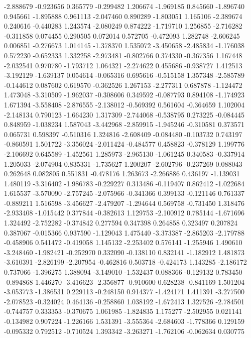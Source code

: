 -2.888679
-0.923656
0.365779
-0.299482
1.206674
-1.969185
0.845660
-1.896740
0.945661
-1.895888
0.961113
-2.047460
0.890289
-1.803051
1.165106
-2.389674
0.240616
-0.440283
1.243574
-2.080249
0.874222
-1.719710
1.256855
-2.716282
-0.311858
0.074455
0.290505
0.072014
0.572705
-0.472093
1.282748
-2.606245
0.006851
-0.276673
1.014145
-1.378370
1.535072
-3.450658
-2.485834
-1.176038
0.572230
-0.652333
1.332258
-2.973481
-0.802766
0.374330
-0.367356
1.167448
-2.032541
0.970780
-1.793712
1.064321
-2.274622
0.455686
-0.938727
1.412513
-3.192129
-1.639137
0.054614
-0.065316
0.695616
-0.515158
1.357348
-2.585789
-0.144612
0.087602
0.619570
-0.362526
1.267153
-2.277311
0.687878
-1.124472
1.473048
-3.310509
-1.962037
-0.308606
0.349592
-0.087793
0.894108
-1.174923
1.671394
-3.558408
-2.876555
-2.138012
-0.569392
0.561604
-0.364659
1.102004
-2.148134
0.790123
-1.664230
1.317309
-2.744068
-0.538795
0.273225
-0.084445
0.848959
-1.038234
1.587043
-3.442968
-2.859915
-1.945246
-0.310581
0.373571
0.065731
0.598397
-0.510316
1.324816
-2.608409
-0.084480
-0.103732
0.743197
-0.860591
1.501722
-3.356024
-2.011424
-0.484577
0.458823
-0.378129
1.199776
-2.106692
0.645589
-1.452561
1.285973
-2.965130
-1.061245
0.340583
-0.337914
1.205033
-2.074904
0.835331
-1.735627
1.200207
-2.602796
-0.237269
0.088043
0.262648
0.082805
0.551831
-0.478176
1.263673
-2.266886
0.436197
-1.139031
1.480119
-3.316402
-1.986783
-0.229227
0.313486
-0.119407
0.862412
-1.022684
1.615537
-3.570090
-2.757245
-2.075966
-0.341366
0.399133
-0.121146
0.761337
-0.889211
1.516598
-3.456627
-2.479207
-1.294644
0.569758
-0.731450
1.318476
-2.933408
-1.015442
0.377844
-0.382613
1.129753
-2.100912
0.785144
-1.671696
1.324492
-2.752282
-0.374842
0.277594
0.347398
0.264858
0.323497
0.207824
0.387067
-0.015366
0.937590
-1.129043
1.475440
-3.373387
-2.865203
-2.179788
-0.458906
0.541472
-0.419058
1.145132
-2.253402
0.576141
-1.255946
1.490610
-3.248460
-1.982421
-0.252970
0.332090
-0.138110
0.832141
-1.182912
1.481873
-3.610391
-2.826199
-2.207954
-0.462816
0.503718
-0.424173
1.143285
-2.186172
0.737066
-1.396275
1.388094
-3.149010
-1.532437
0.088366
-0.129132
0.783450
-0.894868
1.446270
-3.416623
-2.356877
-0.910600
0.628238
-0.841169
1.501204
-3.053773
-1.386531
0.229113
-0.248150
0.914377
-1.424171
1.411391
-3.277500
-2.078523
-0.324024
0.464136
-0.258860
1.038192
-1.672413
1.327526
-2.784501
-0.744757
0.333353
-0.370675
1.061985
-1.824835
1.175277
-2.502955
0.021141
-0.134982
0.907224
-1.226166
1.531391
-3.555364
-2.684603
-1.778366
0.129159
-0.095332
0.792512
-0.710524
1.393342
-3.263271
-1.762106
-0.062634
0.030775
